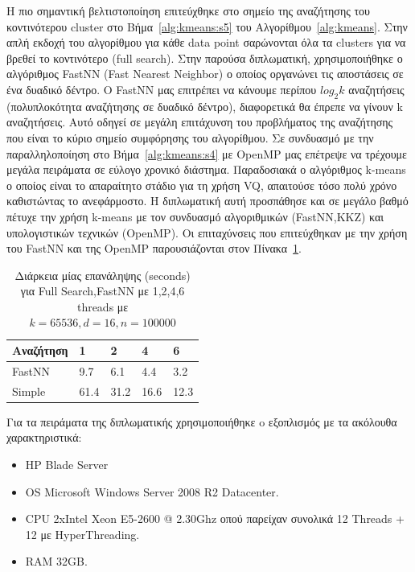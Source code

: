 \indent Η πιο σημαντική βελτιστοποίηση επιτεύχθηκε στο σημείο της αναζήτησης του κοντινότερου cluster στο
Βήμα~\ref{alg:kmeans:s5} του Αλγορίθμου~\ref{alg:kmeans}. Στην απλή εκδοχή του αλγορίθμου για κάθε data point
σαρώνονται όλα τα clusters για να βρεθεί το κοντινότερο (full search). Στην παρούσα διπλωματική, χρησιμοποιήθηκε ο αλγόριθμος
FastNN (Fast Nearest Neighbor) \cite{fastnn} ο οποίος οργανώνει τις αποστάσεις σε ένα δυαδικό δέντρο. Ο FastNN μας επιτρέπει να κάνουμε περίπου
$ log_{2} k $  αναζητήσεις (πολυπλοκότητα αναζήτησης σε δυαδικό δέντρο), διαφορετικά θα έπρεπε να γίνουν k αναζητήσεις.
Αυτό οδηγεί σε μεγάλη επιτάχυνση του προβλήματος της αναζήτησης που είναι το κύριο σημείο συμφόρησης του αλγορίθμου. Σε
συνδυασμό με την παραλληλοποίηση στο Βήμα~\ref{alg:kmeans:s4} με OpenMP μας επέτρεψε να τρέχουμε μεγάλα πειράματα σε
εύλογο χρονικό διάστημα. Παραδοσιακά ο αλγόριθμος k-means ο οποίος είναι το απαραίτητο στάδιο για τη χρήση VQ, απαιτούσε τόσο πολύ χρόνο καθιστώντας το ανεφάρμοστο. Η διπλωματική αυτή προσπάθησε και σε μεγάλο βαθμό πέτυχε την χρήση k-means με τον συνδυασμό αλγοριθμικών (FastNN,KKZ) και υπολογιστικών τεχνικών (OpenMP). Οι επιταχύνσεις που επιτεύχθηκαν με την χρήση του FastNN και της OpenMP παρουσιάζονται
στον Πίνακα~\ref{table:fastnn}.

\begin{table}[h!]
    \begin{center}
        \begin{tabular}{| l | l | l | l | l |}
        \hline
        Αναζήτηση   & 1     & 2      & 4     & 6    \\ \hline
        FastNN      & 9.7   & 6.1    & 4.4   & 3.2  \\ \hline
        Simple      & 61.4  & 31.2   & 16.6  & 12.3    \\ \hline
        \hline
        \end{tabular}
    \end{center}
    \caption{Διάρκεια μίας επανάληψης (seconds) για Full Search,FastNN με 1,2,4,6 threads με $k=65536,d=16,n=100000$}
    \label{table:fastnn}
\end{table}

\newpage

\indent Για τα πειράματα της διπλωματικής χρησιμοποιήθηκε o εξοπλισμός με τα ακόλουθα χαρακτηριστικά:
\begin{itemize}
    \item HP Blade Server
    \item OS Microsoft Windows Server 2008 R2 Datacenter.
    \item CPU 2xIntel Xeon E5-2600 @ 2.30Ghz οπού παρείχαν συνολικά 12 Threads + 12 με HyperThreading.
    \item RAM 32GB.
\end{itemize} 